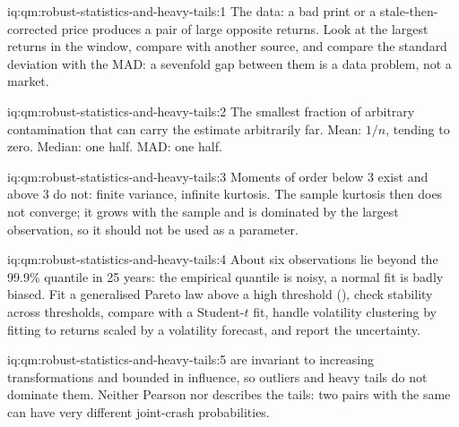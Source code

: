 \begin{solution}{iq:qm:robust-statistics-and-heavy-tails:1}
The data: a bad print or a stale-then-corrected price produces a pair of large opposite returns. Look at the largest returns in the window,
compare with another source, and compare the standard deviation with the MAD: a sevenfold gap between them is a data problem, not a market.
\end{solution}

\begin{solution}{iq:qm:robust-statistics-and-heavy-tails:2}
The smallest fraction of arbitrary contamination that can carry the estimate arbitrarily far. Mean: $1/n$, tending to zero. Median: one half.
MAD: one half.
\end{solution}

\begin{solution}{iq:qm:robust-statistics-and-heavy-tails:3}
Moments of order below 3 exist and above 3 do not: finite variance, infinite kurtosis. The sample kurtosis then does not converge; it grows with
the sample and is dominated by the largest observation, so it should not be used as a parameter.
\end{solution}

\begin{solution}{iq:qm:robust-statistics-and-heavy-tails:4}
About six observations lie beyond the 99.9\% quantile in 25 years: the empirical quantile is noisy, a normal fit is badly biased. Fit a
generalised Pareto law above a high threshold (), check stability across thresholds, compare with a Student-$t$ fit,
handle volatility clustering by fitting to returns scaled by a volatility forecast, and report the uncertainty.
\end{solution}

\begin{solution}{iq:qm:robust-statistics-and-heavy-tails:5}
 are invariant to increasing transformations and bounded in influence, so outliers and heavy tails do not dominate them. Neither
Pearson nor  describes the tails: two pairs with the same  can have very different joint-crash
probabilities.
\end{solution}

